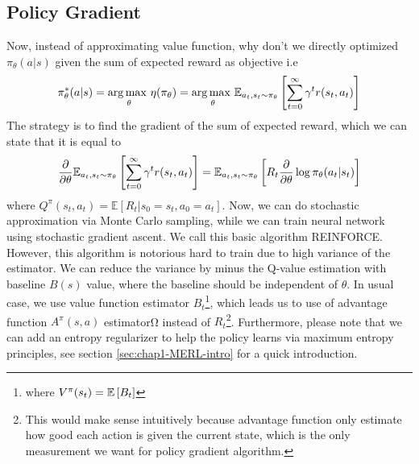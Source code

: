 \subsection{Policy Gradient \cite{sutton2000policy}}
Now, instead of approximating value function, why don't we directly optimized $\pi_\theta(a | s)$ given the sum of expected reward as objective i.e 
\begin{equation}
    \pi_\theta^*(a | s) = \underset{\theta}{\arg\max \ } \eta(\pi_\theta) = \underset{\theta}{\arg\max \ }\mathbb{E}_{a_t, s_t \sim \pi_\theta}\left[ \sum^\infty_{t=0}\gamma^t r(s_t, a_t) \right]
\end{equation}
The strategy is to find the gradient of the sum of expected reward, which we can state that it is equal to
\begin{equation}
    \frac{\partial}{\partial \theta} \mathbb{E}_{a_t, s_t \sim \pi_\theta}\left[ \sum^\infty_{t=0}\gamma^t r(s_t, a_t) \right] = \mathbb{E}_{a_t, s_t \sim \pi_\theta}\left[ R_t\frac{\partial}{\partial \theta} \log \pi_\theta(a_t | s_t)  \right]
\end{equation}
where $Q^\pi(s_t, a_t) = \mathbb{E}\left[R_t | s_0 = s_t, a_0 = a_t\right]$. Now, we can do stochastic approximation via Monte Carlo sampling, while we can train neural network using stochastic gradient ascent. We call this basic algorithm REINFORCE. However, this algorithm is notorious hard to train due to high variance of the estimator. We can reduce the variance by minus the Q-value estimation with baseline $B(s)$ value, where the baseline should be independent of $\theta$. In usual case, we use value function estimator $B_t$\footnote{where $V^\pi(s_t) = \mathbb{E}\left[ B_t \right]$}, which leads us to use of advantage function $A^\pi(s, a)$ estimatorΩ instead of $R_t$\footnote{This would make sense intuitively because advantage function only estimate how good each action is given the current state, which is the only measurement we want for policy gradient algorithm.}. Furthermore, please note that we can add an entropy regularizer to help the policy learns via maximum entropy principles, see section \ref{sec:chap1-MERL-intro} for a quick introduction.

